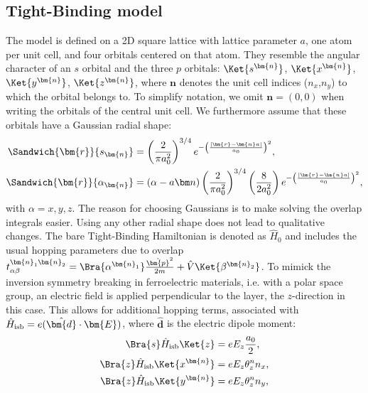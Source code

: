 \subsection{Tight-Binding model \label{sec:tb_model}}
The model is defined on a 2D square lattice with lattice parameter $a$, one atom per unit cell, and four orbitals centered on that atom.
They resemble the angular character of an $s$ orbital and the three $p$ orbitals: $\Ket{s^{\bm{n}}}$, $\Ket{x^{\bm{n}}}$, $\Ket{y^{\bm{n}}}$, $\Ket{z^{\bm{n}}}$, where $\bm{n}$ denotes the unit cell indices ($n_x$,$n_y$) to which the orbital belongs to.
To simplify notation, we omit $\bm{n} = (0, 0)$ when writing the orbitals of the central unit cell.
We furthermore assume that these orbitals have a Gaussian radial shape:
\begin{align}
	\Sandwich{\bm{r}}{s_{\bm{n}}} &= \left(\frac{2}{\pi a_0^2}\right)^{3/4}e^{-\left(\frac{|\bm{r}-\bm{n}a|}{a_0}\right)^2},\\
\Sandwich{\bm{r}}{\alpha_{\bm{n}}} &= (\alpha - a\bm n)\left(\frac{2}{\pi a_0^2}\right)^{3/4}\left(\frac{8}{2a_0^2}\right) e^{-\left(\frac{|\bm{r}-\bm{n}a|}{a_0}\right)^2},
\end{align}
with $\alpha = x, y, z$.
The reason for choosing Gaussians is to make solving the overlap integrals easier.
Using any other radial shape does not lead to qualitative changes.
The bare Tight-Binding Hamiltonian is denoted as $\hat{H}_0$ and includes the usual hopping parameters due to overlap $t_{\alpha\beta}^{\bm{n}_1\bm{n}_2} = \Bra{\alpha^{\bm{n}_1}}\frac{\hat{\bm{p}}^2}{2m} + \hat{V}\Ket{\beta^{\bm{n}_2}}$.
To mimick the inversion symmetry breaking in ferroelectric materials, i.e. with a polar space group, an electric field is applied perpendicular to the layer, the $z$-direction in this case.
This allows for additional hopping terms, associated with $\hat{H}_{\rm isb} = e (\hat{\bm{d}}\cdot \bm{E})$, where $\hat{\bm{d}}$ is the electric dipole moment:
\begin{align}
	\label{eq:dipole}
	\Bra{s} \hat{H}_{\rm isb} \Ket{z} &=  e E_z \frac{a_0}{2},\\
	\Bra{z} \hat{H}_{\rm isb} \Ket{x^{\bm{n}}} &= e E_z \theta_z^n n_x,\\
	\Bra{z} \hat{H}_{\rm isb} \Ket{y^{\bm{n}}} &= e E_z \theta_z^n n_y,
\end{align}
